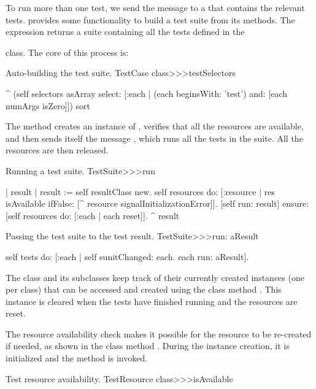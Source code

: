 \documentclass[a4paper,10pt,twoside]{book}
\begin{document}
To run more than one test, we send the message  to a  that contains the relevant tests.
 provides some functionality to build a test suite from its methods.
The expression  returns a suite containing all the tests defined in the { class.
The core of this process is:
\begin{method}[testcasetestselectors]{Auto-building the test suite.}
TestCase class>>>testSelectors

	^ (self selectors asArray select: [:each |
		(each beginsWith: 'test') and: [each numArgs isZero]]) sort
\end{method}

The method  creates an instance of , verifies that all the resources are available, and then sends itself the message , which runs all the tests in the suite.
All the resources are then released.
\begin{method}[testsuiterun]{Running a test suite.}
TestSuite>>>run

	| result |
 	result := self resultClass new.
	self resources do: [:resource |
		res isAvailable ifFalse: [^ resource signalInitializationError]].
	[self run: result] ensure: [self resources do: [:each | each reset]].
	^ result
\end{method}

\begin{method}[testsuiterun:]{Passing the test suite to the test result.}
TestSuite>>>run: aResult

	self tests do: [:each |
		self sunitChanged: each.
		each run: aResult].
\end{method}
The class  and its subclasses keep track of their currently created instances (one per class) that can be accessed and created using the class method .
This instance is cleared when the tests have finished running and the resources are reset.

The resource availability check makes it possible for the resource to be re-created if needed, as shown in the class method .
During the  instance creation, it is initialized and the method  is invoked.

\begin{method}[testresourceisavailable]{Test resource availability.}
TestResource class>>>isAvailable


\end{method}}
\end{document}
